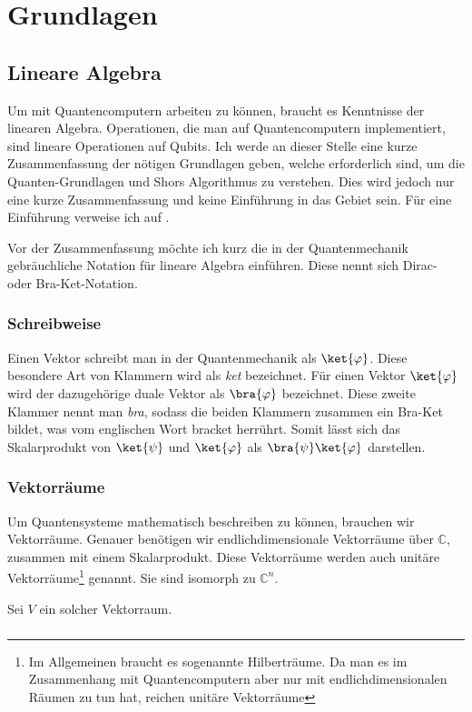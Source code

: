 \chapter{Grundlagen}
\section{Lineare Algebra}
Um mit Quantencomputern arbeiten zu können, braucht es Kenntnisse der linearen Algebra. Operationen, die man auf Quantencomputern implementiert, sind lineare Operationen auf Qubits. Ich werde an dieser Stelle eine kurze Zusammenfassung der nötigen Grundlagen geben, welche erforderlich sind, um die Quanten-Grundlagen und Shors Algorithmus zu verstehen. Dies wird jedoch nur eine kurze Zusammenfassung und keine Einführung in das Gebiet sein. Für eine Einführung verweise ich auf \cite{LA}.

Vor der Zusammenfassung möchte ich kurz die in der Quantenmechanik gebräuchliche Notation für lineare Algebra einführen. Diese nennt sich Dirac- oder Bra-Ket-Notation. 

\subsection{Schreibweise}
Einen Vektor schreibt man in der Quantenmechanik als $\ket{\varphi}$. Diese besondere Art von Klammern wird als \textit{ket} bezeichnet. Für einen Vektor $\ket{\varphi}$ wird der dazugehörige duale Vektor als $\bra{\varphi}$ bezeichnet. Diese zweite Klammer nennt man \textit{bra}, sodass die beiden Klammern zusammen ein Bra-Ket bildet, was vom englischen Wort bracket herrührt. Somit lässt sich das Skalarprodukt von $\ket{\psi}$ und $\ket{\varphi}$ als $\bra{\psi}\ket{\varphi}$ darstellen.

\subsection{Vektorräume}
Um Quantensysteme mathematisch beschreiben zu können, brauchen wir Vektorräume. Genauer benötigen wir endlichdimensionale Vektorräume über $\mathbb{C}$, zusammen mit einem Skalarprodukt. Diese Vektorräume werden auch unitäre Vektorräume\footnote{Im Allgemeinen braucht es sogenannte Hilberträume. Da man es im Zusammenhang mit Quantencomputern aber nur mit endlichdimensionalen Räumen zu tun hat, reichen unitäre Vektorräume} genannt. Sie sind isomorph zu $\mathbb{C}^n$.

Sei $V$ ein solcher Vektorraum. 
\paragraph{}

